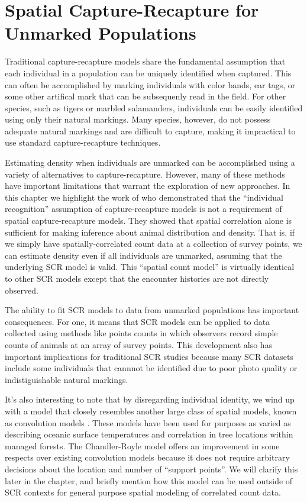 


\chapter{Spatial Capture-Recapture for Unmarked Populations}
\label{chapt.scr-unmarked}

\vspace{0.3cm}


Traditional capture-recapture models share the fundamental
assumption that each individual in a population can be uniquely
identified when captured. This can often be accomplished
by marking individuals with color bands, ear tags, or some other
artifical mark that can be subsequenly read in the field. For other species, such as
tigers or marbled salamanders, individuals can be easily identified
using only their natural markings. Many species, however,
do not possess adequate natural markings and are
difficult to capture, making it impractical to use standard
capture-recapture techniques.

Estimating density when individuals are unmarked can be accomplished
using a variety of alternatives to capture-recapture. However, many of
these methods have important limitations that warrant the exploration
of new approaches.
In this chapter we highlight the work of \citet{chandler_royle:2012}
who demonstrated that the ``individual recognition'' assumption of
capture-recapture models is not a requirement of spatial capture-recapture
models. They showed that spatial correlation alone is sufficient for
making inference about animal distribution and density. That is, if
we simply have spatially-correlated
count data at a collection of survey points, we can estimate density
even if all individuals are unmarked, assuming that the underlying SCR
model is valid. This ``spatial count model'' is virtually identical to
other SCR models except that the encounter histories are not directly
observed.

The ability to fit
SCR models to data from unmarked populations has important
consequences. For one, it means that SCR models can
be applied to data collected using methods like points counts in which
observers record simple counts of animals at an array of survey
points. This development also has important implications for
traditional SCR studies because many SCR datasets include some
individuals that cannnot be identified due to poor photo quality or
indistiguishable natural markings.

It's also interesting to note that by disregarding individual
identity, we wind up with a model that closely resembles another large
class of spatial models, known as convolution models
\citep{wolpert_ickstadt:1998,higdon:1998}. These
models have been used for purposes as varied as describing oceanic
surface temperatures and correlation in tree locations within managed
forests. The Chandler-Royle model offers an improvement in
some respects over existing convolution models because it does not
require arbitrary decisions about the location and number of ``support
points''. We will clarify this later in the chapter, and briefly
mention how this model can be used outside of SCR contexts for general
purpose spatial modeling of correlated count data.



